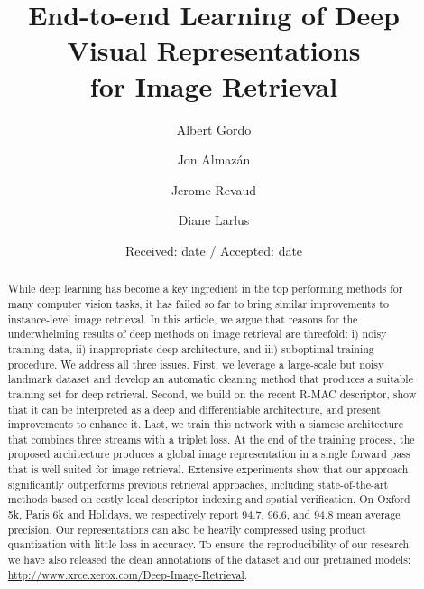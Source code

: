 \documentclass[twocolumn]{svjour3}          \smartqed  \usepackage{graphicx}
\begin{document}
\title{End-to-end Learning of Deep Visual Representations\\ for Image Retrieval}




\author{Albert Gordo \and Jon Almaz\'an \and Jerome Revaud \and Diane Larlus}

\date{Received: date / Accepted: date}



\maketitle
\begin{abstract}
  While deep learning has become a key ingredient in the top performing
  methods for many computer vision tasks, it has failed so far to bring similar improvements to instance-level image retrieval. In this article,
  we argue that reasons for the underwhelming results of deep methods
  on image retrieval are threefold: i) noisy training data, ii)
  inappropriate deep architecture, and iii) suboptimal training
  procedure. We address all three issues.
  First, we leverage a large-scale but noisy landmark dataset and develop an automatic cleaning method that produces a suitable training set for deep retrieval.
  Second, we build on the recent R-MAC descriptor, show that it can be interpreted as a deep and differentiable architecture, and present improvements to enhance it.
  Last, we train this network with a siamese architecture that combines three streams with a triplet loss. 
  At the end of the training process, the proposed architecture produces a global image representation in a single forward pass that is well suited for image retrieval.
  Extensive experiments show that our approach significantly outperforms previous retrieval approaches, including state-of-the-art methods based on costly local descriptor
  indexing and spatial verification.
  On Oxford 5k, Paris 6k and Holidays, we respectively report 94.7, 96.6, and 94.8 mean average precision.
  Our representations can also be heavily compressed using product quantization with little loss in accuracy.
  To ensure the reproducibility of our research we have also released the clean annotations of the dataset and our pretrained models:
  \url{http://www.xrce.xerox.com/Deep-Image-Retrieval}.
\end{abstract}
\end{document}
